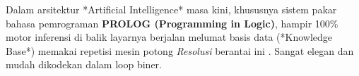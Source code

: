 Dalam arsitektur *Artificial Intelligence* masa kini, khususnya sistem pakar bahasa pemrograman \textbf{PROLOG (Programming in Logic)}, hampir 100\% motor inferensi di balik layarnya berjalan melumat basis data (*Knowledge Base*) memakai repetisi mesin potong \textit{Resolusi} berantai ini \cite{wiki_first_order_logic,libretexts_proofs}. Sangat elegan dan mudah dikodekan dalam loop biner.
